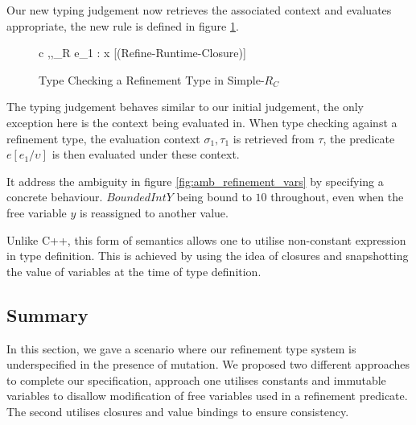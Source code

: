 \documentclass[a4paper,12pt]{report}
\begin{document}
\par
Our new typing judgement now retrieves the associated context 
and evaluates appropriate, the new rule is defined in figure \ref{fig:runtime_refine_closure}. 

\begin{figure}[H]
  \begin{center}
    \begin{tabular}{c}      
      {\Gamma,\sigma,\tau \vdash_{R} e_1 : x } [(Refine-Runtime-Closure)]
    \end{tabular}
  \end{center}
  \caption{Type Checking a Refinement Type in Simple-$R_{C}$}
  \label{fig:runtime_refine_closure}
\end{figure}

\par
The typing judgement behaves similar to our initial judgement, the only 
exception here is the context being evaluated in. When type checking against a 
refinement type, the evaluation context $\sigma_1, \tau_1$ is retrieved 
from $\tau$, the predicate $e[e_1/\upsilon]$ is then evaluated under these context.

\par
It address the ambiguity in figure \ref{fig:amb_refinement_vars} by specifying 
a concrete behaviour. $BoundedIntY$ being bound to $10$ throughout, even when 
the free variable $y$ is reassigned to another value.
 
\par
Unlike C++, this form of semantics allows one to utilise non-constant expression 
in type definition. This is achieved by using the idea of closures and 
snapshotting the value of variables at the time of type definition. 
 
\subsection{Summary}
In this section, we gave a scenario where our refinement type system is 
underspecified in the presence of mutation. We proposed two different approaches 
to complete our specification, approach one utilises constants and immutable 
variables to disallow modification of free variables used in a refinement 
predicate. The second utilises closures and value bindings to ensure 
consistency. 
\end{document}
